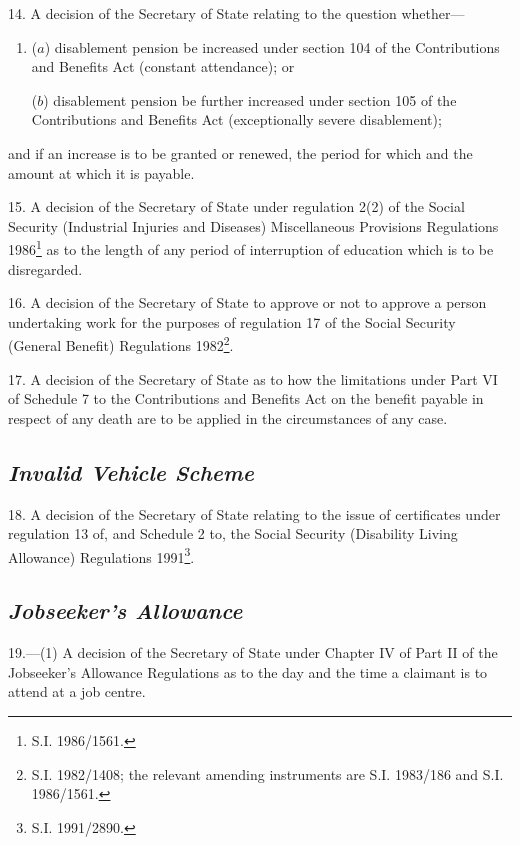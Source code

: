 \documentclass[12pt,a4paper]{article}
\begin{document}
14.  A decision of the Secretary of State relating to the question whether—
\begin{enumerate}\item[]
($a$) disablement pension be increased under section 104 of the Contributions and Benefits Act (constant attendance); or

($b$) disablement pension be further increased under section 105 of the Contributions and Benefits Act (exceptionally severe disablement);
\end{enumerate}
and if an increase is to be granted or renewed, the period for which and the amount at which it is payable.

\medskip

15.  A decision of the Secretary of State under regulation 2(2) of the Social Security (Industrial Injuries and Diseases) Miscellaneous Provisions Regulations 1986\footnote{\frenchspacing S.I. 1986/1561.} as to the length of any period of interruption of education which is to be disregarded.

\medskip

16.  A decision of the Secretary of State to approve or not to approve a person undertaking work for the purposes of regulation 17 of the Social Security (General Benefit) Regulations 1982\footnote{\frenchspacing S.I. 1982/1408; the relevant amending instruments are S.I. 1983/186 and S.I. 1986/1561.}.

\medskip

17.  A decision of the Secretary of State as to how the limitations under Part VI of Schedule 7 to the Contributions and Benefits Act on the benefit payable in respect of any death are to be applied in the circumstances of any case.

\subsection*{\itshape Invalid Vehicle Scheme}

18.  A decision of the Secretary of State relating to the issue of certificates under regulation 13 of, and Schedule 2 to, the Social Security (Disability Living Allowance) Regulations 1991\footnote{\frenchspacing S.I. 1991/2890.}.

\subsection*{\itshape Jobseeker’s Allowance}

19.—(1) A decision of the Secretary of State under Chapter IV of Part II of the Jobseeker’s Allowance Regulations as to the day and the time a claimant is to attend at a job centre.
\end{document}
